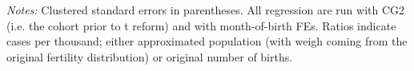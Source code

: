 \documentclass[11pt, a4paper]{scrartcl} %
\begin{document}
\begin{table}[H]
\begin{threeparttable}
{\begin{tabular}{l*{8}{c}}
		\bottomrule 
	\end{tabular} } 
	\begin{tablenotes} 
	\item \scriptsize 
	\emph{Notes:} Clustered standard errors in parentheses. All regression are run with CG2 (i.e. the cohort prior to t	reform) and with month-of-birth FEs. Ratios indicate cases per thousand; either approximated population (with weigh	coming from the original fertility distribution) or original number of births.   
	\end{tablenotes} 
	\end{threeparttable} 
\end{table} 
 





\end{document}
